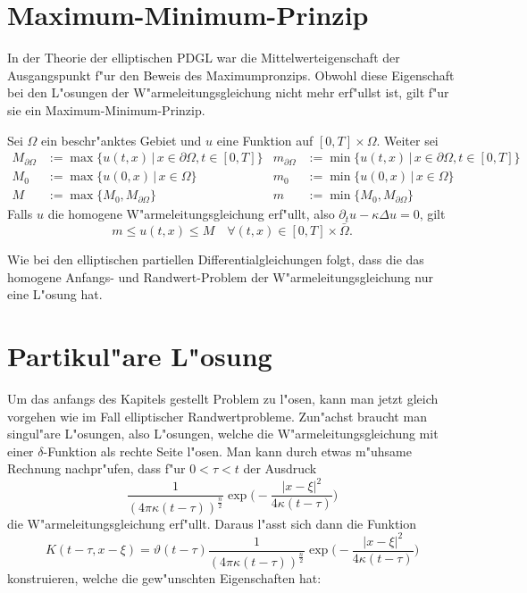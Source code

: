 \section{Maximum-Minimum-Prinzip}
In der Theorie der elliptischen PDGL war die Mittelwerteigenschaft
der Ausgangspunkt f"ur den Beweis des Maximumpronzips. Obwohl
diese Eigenschaft bei den 
L"osungen der W"armeleitungsgleichung nicht mehr erf"ullst ist,
gilt f"ur sie ein Maximum-Minimum-Prinzip.
\begin{satz}
Sei $\Omega$ ein beschr"anktes Gebiet und
$u$ eine Funktion auf $[0,T]\times\Omega$.
Weiter sei
\begin{align*}
M_{\partial \Omega}&:=\max\{u(t,x)\,|\,x\in\partial\Omega, t\in[0,T]\}
&
m_{\partial \Omega}&:=\min\{u(t,x)\,|\,x\in\partial\Omega, t\in[0,T]\}
\\
M_0&:=
\max\{u(0,x)\,|\,x\in\Omega\}
&
m_0&:=
\min\{u(0,x)\,|\,x\in\Omega\}
\\
M&:=\max\{M_0,M_{\partial\Omega}\}
&
m&:=\min\{M_0,M_{\partial\Omega}\}
\end{align*}
Falls $u$ die homogene
W"armeleitungsgleichung erf"ullt, also $\partial_tu-\kappa\Delta u=0$,
gilt
\[
m\le u(t,x)\le M\quad\forall(t,x)\in[0,T]\times\bar\Omega.
\]
\end{satz}
Wie bei den elliptischen partiellen Differentialgleichungen folgt, dass
die das homogene Anfangs- und Randwert-Problem der W"armeleitungsgleichung
nur eine L"osung hat.

\section{Partikul"are L"osung}
Um das anfangs des Kapitels gestellt Problem zu l"osen, kann man jetzt
gleich vorgehen wie im Fall elliptischer Randwertprobleme. Zun"achst
braucht man singul"are L"osungen, also L"osungen, welche die
W"armeleitungsgleichung mit einer $\delta$-Funktion als rechte Seite
l"osen.
Man kann durch etwas m"uhsame Rechnung nachpr"ufen, dass f"ur $0<\tau<t$
der Ausdruck
\[
\frac1{(4\pi\kappa(t-\tau))^{\frac{n}2}}
\exp\biggl(-\frac{|x-\xi|^2}{4\kappa(t-\tau)}\biggr)
\]
die W"armeleitungsgleichung erf"ullt. Daraus l"asst sich
dann die Funktion
\begin{equation}
K(t-\tau, x-\xi)
=
\vartheta(t-\tau)
\frac1{(4\pi\kappa(t-\tau))^{\frac{n}2}}
\exp\biggl(-\frac{|x-\xi|^2}{4\kappa(t-\tau)}\biggr)
\label{parabolischsingulaer}
\end{equation}
konstruieren, welche die gew"unschten Eigenschaften hat:

